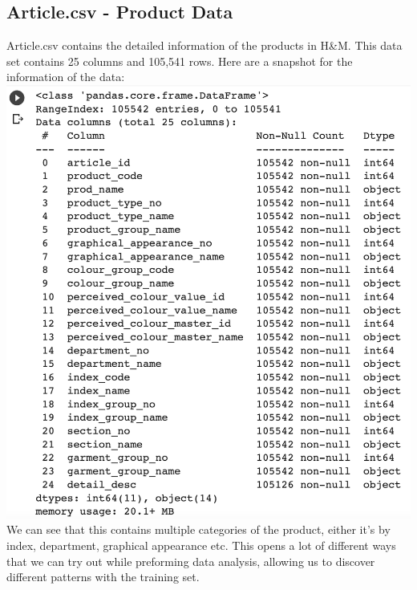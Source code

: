 \documentclass{article}
\begin{document}
\subsection{Article.csv - Product Data}
Article.csv contains the detailed information of the products in H&M. This data set contains 25 columns and 105,541 rows. Here are a snapshot for the information of the data:
\\
\includegraphics[width=\textwidth]{ProductDataRaw}
\\
We can see that this contains multiple categories of the product, either it's by index, department, graphical appearance etc. This opens a lot of different ways that we can try out while preforming data analysis, allowing us to discover different patterns with the training set.
\end{document}
